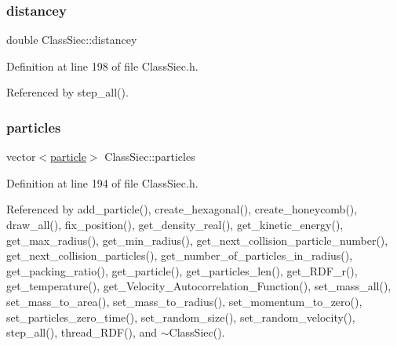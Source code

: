\mbox{\label{classClassSiec_a5c100f779c613f9c747b0b7a3f02f2d9}} 
\subsubsection{\texorpdfstring{distancey}{distancey}}
{\footnotesize\ttfamily double Class\+Siec\+::distancey}



Definition at line 198 of file Class\+Siec.\+h.



Referenced by step\+\_\+all().

\mbox{\label{classClassSiec_aa1a11eee47b10c11930952f092110e94}} 
\subsubsection{\texorpdfstring{particles}{particles}}
{\footnotesize\ttfamily vector$<$\mbox{\hyperlink{structparticle}{particle}}$>$ Class\+Siec\+::particles}



Definition at line 194 of file Class\+Siec.\+h.



Referenced by add\+\_\+particle(), create\+\_\+hexagonal(), create\+\_\+honeycomb(), draw\+\_\+all(), fix\+\_\+position(), get\+\_\+density\+\_\+real(), get\+\_\+kinetic\+\_\+energy(), get\+\_\+max\+\_\+radius(), get\+\_\+min\+\_\+radius(), get\+\_\+next\+\_\+collision\+\_\+particle\+\_\+number(), get\+\_\+next\+\_\+collision\+\_\+particles(), get\+\_\+number\+\_\+of\+\_\+particles\+\_\+in\+\_\+radius(), get\+\_\+packing\+\_\+ratio(), get\+\_\+particle(), get\+\_\+particles\+\_\+len(), get\+\_\+\+R\+D\+F\+\_\+r(), get\+\_\+temperature(), get\+\_\+\+Velocity\+\_\+\+Autocorrelation\+\_\+\+Function(), set\+\_\+mass\+\_\+all(), set\+\_\+mass\+\_\+to\+\_\+area(), set\+\_\+mass\+\_\+to\+\_\+radius(), set\+\_\+momentum\+\_\+to\+\_\+zero(), set\+\_\+particles\+\_\+zero\+\_\+time(), set\+\_\+random\+\_\+size(), set\+\_\+random\+\_\+velocity(), step\+\_\+all(), thread\+\_\+\+R\+D\+F(), and $\sim$\+Class\+Siec().

\mbox{\label{classClassSiec_aa1096135e230dbae78ec05efc8a4725f}} 
